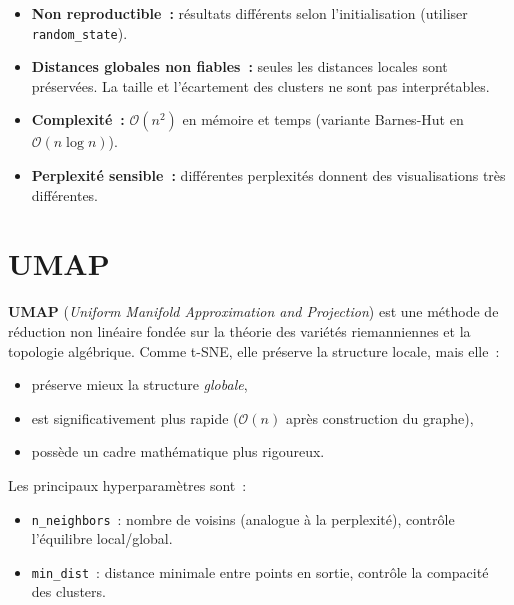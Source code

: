 \begin{attention}[title=\textbf{Limitations de t-SNE}]
\begin{itemize}
  \item \textbf{Non reproductible~:} r\'esultats diff\'erents selon
    l'initialisation (utiliser \texttt{random\_state}).
  \item \textbf{Distances globales non fiables~:} seules les distances locales
    sont pr\'eserv\'ees. La taille et l'\'ecartement des clusters ne sont pas
    interpr\'etables.
  \item \textbf{Complexit\'e~:} $\mathcal{O}(n^2)$ en m\'emoire et temps
    (variante Barnes-Hut en $\mathcal{O}(n \log n)$).
  \item \textbf{Perplexit\'e sensible~:} diff\'erentes perplexit\'es donnent
    des visualisations tr\`es diff\'erentes.
\end{itemize}
\end{attention}

\section{UMAP}
\label{sec:umap}

\begin{definition}[UMAP]
\textbf{UMAP} (\emph{Uniform Manifold Approximation and Projection}) est une
m\'ethode de r\'eduction non lin\'eaire fond\'ee sur la th\'eorie des
vari\'et\'es riemanniennes et la topologie alg\'ebrique. Comme t-SNE, elle
pr\'eserve la structure locale, mais elle~:
\begin{itemize}
  \item pr\'eserve mieux la structure \emph{globale},
  \item est significativement plus rapide ($\mathcal{O}(n)$ apr\`es
    construction du graphe),
  \item poss\`ede un cadre math\'ematique plus rigoureux.
\end{itemize}
\end{definition}

Les principaux hyperparam\`etres sont~:
\begin{itemize}
  \item \texttt{n\_neighbors}~: nombre de voisins (analogue \`a la
    perplexit\'e), contr\^ole l'\'equilibre local/global.
  \item \texttt{min\_dist}~: distance minimale entre points en sortie,
    contr\^ole la compacit\'e des clusters.
\end{itemize}

